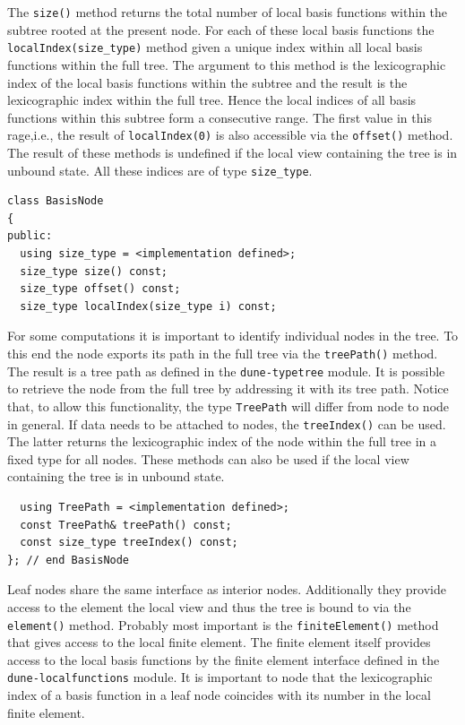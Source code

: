 \documentclass[a4paper,10pt,headings=normal,bibliography=totoc]{scrartcl}
\newcommand{\dunemodule}[1]{\texttt{#1}}
\begin{document}
The \texttt{size()} method returns the total number of
local basis functions within the subtree rooted at the
present node. For each of these local basis functions the
\texttt{localIndex(size\_type)} method given a unique
index within all local basis functions within the full
tree. The argument to this method is the lexicographic
index of the local basis functions within the subtree
and the result is the lexicographic index within the full
tree. Hence the local indices of all basis functions
within this subtree form a consecutive range. The first
value in this rage,i.e., the result of \texttt{localIndex(0)}
is also accessible via the \texttt{offset()} method.
The result of these methods is undefined if the
local view containing the tree is in unbound state.
All these indices are of type \texttt{size\_type}.

\begin{lstlisting}
class BasisNode
{
public:
  using size_type = <implementation defined>;
  size_type size() const;
  size_type offset() const;
  size_type localIndex(size_type i) const;
\end{lstlisting}

For some computations it is important to identify
individual nodes in the tree. To this end the node
exports its path in the full tree via the \texttt{treePath()}
method. The result is a tree path
as defined in the \dunemodule{dune-typetree} module.
It is possible to retrieve the node from the full
tree by addressing it with its tree path.
Notice that, to allow this functionality, the
type \texttt{TreePath} will differ from node to node
in general. If data needs to be attached to nodes,
the \texttt{treeIndex()} can be used. The latter returns
the lexicographic index of the node within the full
tree in a fixed type for all nodes.
These methods can also be used if the local view containing
the tree is in unbound state.

\begin{lstlisting}
  using TreePath = <implementation defined>;
  const TreePath& treePath() const;
  const size_type treeIndex() const;
}; // end BasisNode
\end{lstlisting}

Leaf nodes share the same interface as interior
nodes. Additionally they provide access to the
element the local view and thus the tree is bound
to via the \texttt{element()} method. Probably most important
is the \texttt{finiteElement()} method that gives access
to the local finite element. The finite element
itself provides access to the local basis functions
by the finite element interface defined in the
\dunemodule{dune-localfunctions} module.
It is important to node that the lexicographic
index of a basis function in a leaf node coincides
with its number in the local finite element.
\end{document}
